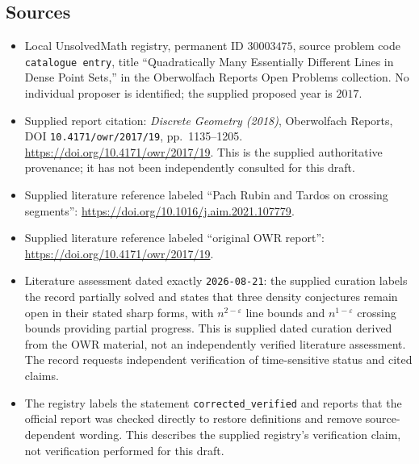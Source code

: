 \documentclass[11pt]{article}
\begin{document}
\subsection{Sources}
\begin{itemize}
\item Local UnsolvedMath registry, permanent ID \(30003475\), source problem code \texttt{catalogue entry}, title ``Quadratically Many Essentially Different Lines in Dense Point Sets,'' in the Oberwolfach Reports Open Problems collection. No individual proposer is identified; the supplied proposed year is \(2017\).
\item Supplied report citation: \emph{Discrete Geometry (2018)}, Oberwolfach Reports, DOI \texttt{10.4171/owr/2017/19}, pp.~1135--1205. \url{https://doi.org/10.4171/owr/2017/19}. This is the supplied authoritative provenance; it has not been independently consulted for this draft.
\item Supplied literature reference labeled ``Pach Rubin and Tardos on crossing segments'': \url{https://doi.org/10.1016/j.aim.2021.107779}.
\item Supplied literature reference labeled ``original OWR report'': \url{https://doi.org/10.4171/owr/2017/19}.
\item Literature assessment dated exactly \texttt{2026-08-21}: the supplied curation labels the record partially solved and states that three density conjectures remain open in their stated sharp forms, with \(n^{2-\varepsilon}\) line bounds and \(n^{1-\varepsilon}\) crossing bounds providing partial progress. This is supplied dated curation derived from the OWR material, not an independently verified literature assessment. The record requests independent verification of time-sensitive status and cited claims.
\item The registry labels the statement \texttt{corrected\_verified} and reports that the official report was checked directly to restore definitions and remove source-dependent wording. This describes the supplied registry's verification claim, not verification performed for this draft.
\end{itemize}
\end{document}
